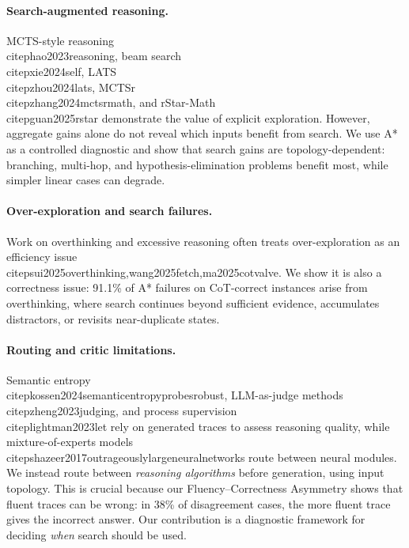 \documentclass{article}
\begin{document}
\paragraph{Search-augmented reasoning.}
MCTS-style reasoning~\\citep{hao2023reasoning}, beam search~\\citep{xie2024self}, LATS~\\citep{zhou2024lats}, MCTSr~\\citep{zhang2024mctsrmath}, and rStar-Math~\\citep{guan2025rstar} demonstrate the value of explicit exploration. However, aggregate gains alone do not reveal which inputs benefit from search. We use A* as a controlled diagnostic and show that search gains are topology-dependent: branching, multi-hop, and hypothesis-elimination problems benefit most, while simpler linear cases can degrade.

\paragraph{Over-exploration and search failures.}
Work on overthinking and excessive reasoning often treats over-exploration as an efficiency issue~\\citep{sui2025overthinking,wang2025fetch,ma2025cotvalve}. We show it is also a correctness issue: 91.1\% of A* failures on CoT-correct instances arise from overthinking, where search continues beyond sufficient evidence, accumulates distractors, or revisits near-duplicate states.

\paragraph{Routing and critic limitations.}
Semantic entropy~\\citep{kossen2024semanticentropyprobesrobust}, LLM-as-judge methods~\\citep{zheng2023judging}, and process supervision~\\citep{lightman2023let} rely on generated traces to assess reasoning quality, while mixture-of-experts models~\\citep{shazeer2017outrageouslylargeneuralnetworks} route between neural modules. We instead route between \emph{reasoning algorithms} before generation, using input topology. This is crucial because our Fluency--Correctness Asymmetry shows that fluent traces can be wrong: in 38\% of disagreement cases, the more fluent trace gives the incorrect answer. Our contribution is a diagnostic framework for deciding \emph{when} search should be used.
\end{document}
